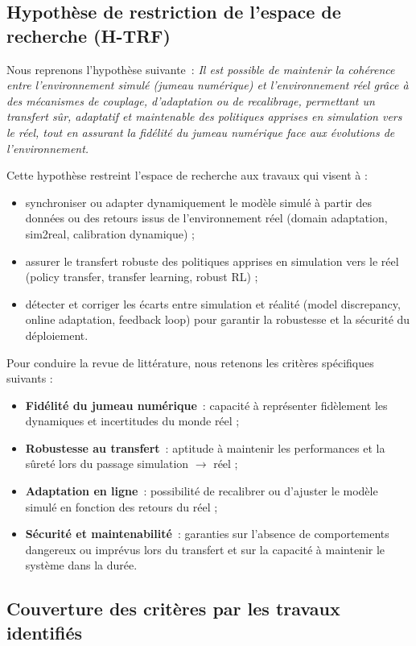 \subsection*{Hypothèse de restriction de l’espace de recherche (H-TRF)}

Nous reprenons l’hypothèse suivante~: \textit{Il est possible de maintenir la cohérence entre l’environnement simulé (jumeau numérique) et l’environnement réel grâce à des mécanismes de couplage, d’adaptation ou de recalibrage, permettant un transfert sûr, adaptatif et maintenable des politiques apprises en simulation vers le réel, tout en assurant la fidélité du jumeau numérique face aux évolutions de l’environnement.}

Cette hypothèse restreint l’espace de recherche aux travaux qui visent à :
\begin{itemize}
  \item synchroniser ou adapter dynamiquement le modèle simulé à partir des données ou des retours issus de l’environnement réel (domain adaptation, sim2real, calibration dynamique) ;
  \item assurer le transfert robuste des politiques apprises en simulation vers le réel (policy transfer, transfer learning, robust RL) ;
  \item détecter et corriger les écarts entre simulation et réalité (model discrepancy, online adaptation, feedback loop) pour garantir la robustesse et la sécurité du déploiement.
\end{itemize}

Pour conduire la revue de littérature, nous retenons les critères spécifiques suivants :
\begin{itemize}
  \item \textbf{Fidélité du jumeau numérique}~: capacité à représenter fidèlement les dynamiques et incertitudes du monde réel ;
  \item \textbf{Robustesse au transfert}~: aptitude à maintenir les performances et la sûreté lors du passage simulation $\rightarrow$ réel ;
  \item \textbf{Adaptation en ligne}~: possibilité de recalibrer ou d’ajuster le modèle simulé en fonction des retours du réel ;
  \item \textbf{Sécurité et maintenabilité}~: garanties sur l’absence de comportements dangereux ou imprévus lors du transfert et sur la capacité à maintenir le système dans la durée.
\end{itemize}

\subsection*{Couverture des critères par les travaux identifiés}

